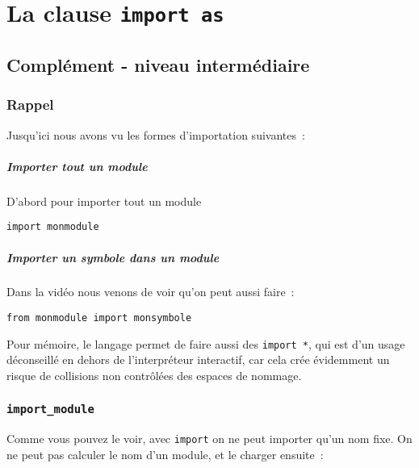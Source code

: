     \hypertarget{la-clause-import-as}{%
\section{\texorpdfstring{La clause
\texttt{import\ as}}{La clause import as}}\label{la-clause-import-as}}

    \hypertarget{compluxe9ment---niveau-intermuxe9diaire}{%
\subsection{Complément - niveau
intermédiaire}\label{compluxe9ment---niveau-intermuxe9diaire}}

    \hypertarget{rappel}{%
\subsubsection{Rappel}\label{rappel}}

    Jusqu'ici nous avons vu les formes d'importation suivantes~:

    \hypertarget{importer-tout-un-module}{%
\subparagraph{Importer tout un module}\label{importer-tout-un-module}}

    D'abord pour importer tout un module

    \begin{verbatim}
import monmodule
\end{verbatim}

    \hypertarget{importer-un-symbole-dans-un-module}{%
\subparagraph{Importer un symbole dans un
module}\label{importer-un-symbole-dans-un-module}}

    Dans la vidéo nous venons de voir qu'on peut aussi faire~:

    \begin{verbatim}
from monmodule import monsymbole
\end{verbatim}

    Pour mémoire, le langage permet de faire aussi des \texttt{import\ *},
qui est d'un usage déconseillé en dehors de l'interpréteur interactif,
car cela crée évidemment un risque de collisions non contrôlées des
espaces de nommage.

    \hypertarget{import_module}{%
\subsubsection{\texorpdfstring{\texttt{import\_module}}{import\_module}}\label{import_module}}

    Comme vous pouvez le voir, avec \texttt{import} on ne peut importer
qu'un nom fixe. On ne peut pas calculer le nom d'un module, et le
charger ensuite~:

